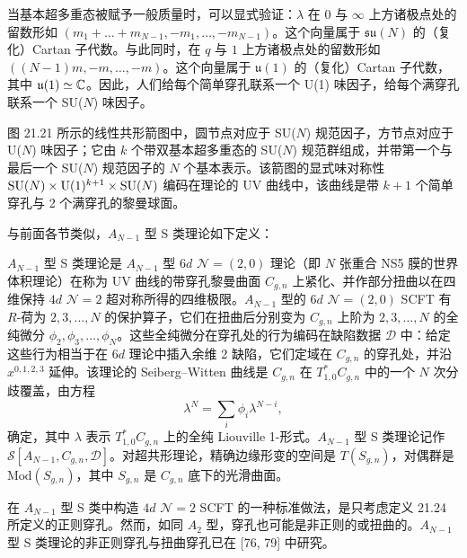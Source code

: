 当基本超多重态被赋予一般质量时，可以显式验证：$\lambda$ 在 0 与 $\infty$ 上方诸极点处的留数形如 $(m_1+\dots+m_{N-1},-m_1,\dots,-m_{N-1})$。这个向量属于 $\mathfrak{su}(N)$ 的（复化）Cartan 子代数。与此同时，在 $q$ 与 $1$ 上方诸极点处的留数形如 $((N-1)m,-m,\dots,-m)$。这个向量属于 $\mathfrak{u}(1)$ 的（复化）Cartan 子代数，其中 $\mathfrak{u}(1)\simeq\mathbb{C}$。因此，人们给每个简单穿孔联系一个 U(1) 味因子，给每个满穿孔联系一个 SU($N$) 味因子。

图 21.21 所示的线性共形箭图中，圆节点对应于 SU($N$) 规范因子，方节点对应于 U($N$) 味因子；它由 $k$ 个带双基本超多重态的 SU($N$) 规范群组成，并带第一个与最后一个 SU($N$) 规范因子的 $N$ 个基本表示。该箭图的显式味对称性 $\operatorname{SU}(N)\times\operatorname{U}(1)^{k+1}\times\operatorname{SU}(N)$ 编码在理论的 UV 曲线中，该曲线是带 $k+1$ 个简单穿孔与 2 个满穿孔的黎曼球面。


与前面各节类似，$A_{N-1}$ 型 S 类理论如下定义：

\begin{definition}[21.37] $A_{N-1}$ 型 S 类理论是 $A_{N-1}$ 型 $6d$ $\mathcal{N}=(2,0)$ 理论（即 $N$ 张重合 NS5 膜的世界体积理论）在称为 UV 曲线的带穿孔黎曼曲面 $C_{g,n}$ 上紧化、并作部分扭曲以在四维保持 $4d$ $\mathcal{N}=2$ 超对称所得的四维极限。$A_{N-1}$ 型的 $6d$ $\mathcal{N}=(2,0)$ SCFT 有 $R$-荷为 $2,3,\dots,N$ 的保护算子，它们在扭曲后分别变为 $C_{g,n}$ 上阶为 $2,3,\dots,N$ 的全纯微分 $\phi_2,\phi_3,\dots,\phi_N$。这些全纯微分在穿孔处的行为编码在缺陷数据 $\mathcal{D}$ 中：给定这些行为相当于在 $6d$ 理论中插入余维 2 缺陷，它们定域在 $C_{g,n}$ 的穿孔处，并沿 $x^{0,1,2,3}$ 延伸。该理论的 Seiberg–Witten 曲线是 $C_{g,n}$ 在 $T^*_{1,0}C_{g,n}$ 中的一个 $N$ 次分歧覆盖，由方程
\begin{equation}
\lambda^N=\sum_i\phi_i\lambda^{N-i}, \tag{21.16}
\end{equation}
确定，其中 $\lambda$ 表示 $T^*_{1,0}C_{g,n}$ 上的全纯 Liouville 1-形式。$A_{N-1}$ 型 S 类理论记作 $\mathcal{S}[A_{N-1},C_{g,n},\mathcal{D}]$。对超共形理论，精确边缘形变的空间是 $T(S_{g,n})$，对偶群是 $\mathrm{Mod}(S_{g,n})$，其中 $S_{g,n}$ 是 $C_{g,n}$ 底下的光滑曲面。
\end{definition}

\begin{remark}[21.38] 在 $A_{N-1}$ 型 S 类中构造 $4d$ $\mathcal{N}=2$ SCFT 的一种标准做法，是只考虑定义 21.24 所定义的正则穿孔。然而，如同 $A_2$ 型，穿孔也可能是非正则的或扭曲的。$A_{N-1}$ 型 S 类理论的非正则穿孔与扭曲穿孔已在 [76, 79] 中研究。
\end{remark}


